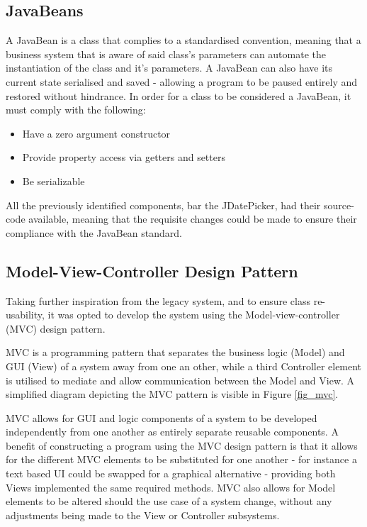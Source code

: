\documentclass[12pt, a4paper,titlepage]{article}
\begin{document}
\subsection{JavaBeans}
A JavaBean is a class that complies to a standardised convention, meaning that
a business system that is aware of said class’s parameters can automate the
instantiation of the class and it’s parameters. 
A JavaBean can also have its current state serialised and saved - allowing a
program to be paused entirely and restored without hindrance.  
In order for a class to be considered a JavaBean, it must comply with the
following:
\begin{itemize}
    \item Have a zero argument constructor
    \item Provide property access via getters and setters
    \item Be serializable
\end{itemize}

All the previously identified components, bar the JDatePicker, had their
source-code available, meaning that the requisite changes could be made to
ensure their compliance with the JavaBean standard.

\subsection{Model-View-Controller Design Pattern}
Taking further inspiration from the legacy system, and to ensure class
re-usability, it was opted to develop the system using the
Model-view-controller (MVC) design pattern.

MVC is a programming  pattern that separates the business logic (Model) and GUI
(View) of a system away from one an other, while a third Controller element is
utilised to mediate and allow communication between the Model and View.
A simplified diagram depicting the MVC pattern is visible in Figure
\ref{fig_mvc}.

MVC allows for GUI and logic components of a system to be developed
independently from one another as entirely separate reusable components.  
A benefit of constructing a program using the MVC design pattern is that it
allows for the different MVC elements to be substituted for one another - for
instance a text based UI could be swapped for a graphical alternative -
providing both Views implemented the same required methods.
MVC also allows for Model elements to be altered should the use case of a
system change, without any adjustments being made to the View or Controller
subsystems.
\end{document}
